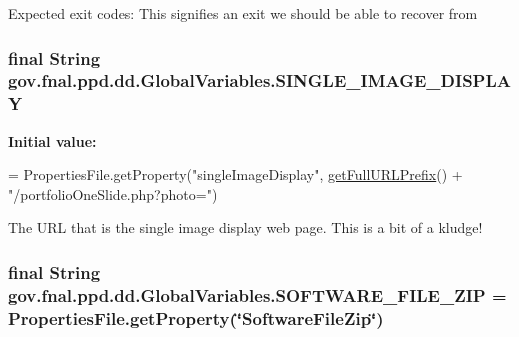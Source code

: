Expected exit codes\-: This signifies an exit we should be able to recover from \hypertarget{classgov_1_1fnal_1_1ppd_1_1dd_1_1GlobalVariables_ab018dd06fadda0d1bc99e7de66894e84}{
\subsubsection[{S\-I\-N\-G\-L\-E\-\_\-\-I\-M\-A\-G\-E\-\_\-\-D\-I\-S\-P\-L\-A\-Y}]{\setlength{\rightskip}{0pt plus 5cm}final String gov.\-fnal.\-ppd.\-dd.\-Global\-Variables.\-S\-I\-N\-G\-L\-E\-\_\-\-I\-M\-A\-G\-E\-\_\-\-D\-I\-S\-P\-L\-A\-Y\hspace{0.3cm}{\ttfamily [static]}}}\label{classgov_1_1fnal_1_1ppd_1_1dd_1_1GlobalVariables_ab018dd06fadda0d1bc99e7de66894e84}
{\bfseries Initial value\-:}
\begin{DoxyCode}
= PropertiesFile.getProperty(\textcolor{stringliteral}{"singleImageDisplay"},
            \hyperlink{classgov_1_1fnal_1_1ppd_1_1dd_1_1GlobalVariables_ab7639ebfcc296b374593079a06026c65}{getFullURLPrefix}() + \textcolor{stringliteral}{"/portfolioOneSlide.php?photo="})
\end{DoxyCode}
The U\-R\-L that is the single image display web page. This is a bit of a kludge! \hypertarget{classgov_1_1fnal_1_1ppd_1_1dd_1_1GlobalVariables_ab8e56e6480b2c30248d2e20aee782cb4}{
\subsubsection[{S\-O\-F\-T\-W\-A\-R\-E\-\_\-\-F\-I\-L\-E\-\_\-\-Z\-I\-P}]{\setlength{\rightskip}{0pt plus 5cm}final String gov.\-fnal.\-ppd.\-dd.\-Global\-Variables.\-S\-O\-F\-T\-W\-A\-R\-E\-\_\-\-F\-I\-L\-E\-\_\-\-Z\-I\-P = Properties\-File.\-get\-Property(\char`\"{}Software\-File\-Zip\char`\"{})\hspace{0.3cm}{\ttfamily [static]}}}\label{classgov_1_1fnal_1_1ppd_1_1dd_1_1GlobalVariables_ab8e56e6480b2c30248d2e20aee782cb4}
